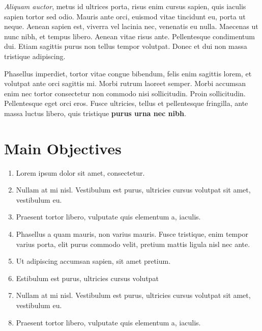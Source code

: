 \documentclass[a0,landscape]{a0poster}
\begin{document}
\begin{multicols}{4}
\textit{Aliquam auctor}, metus id ultrices porta, risus enim cursus sapien, quis iaculis sapien tortor sed odio. Mauris ante orci, euismod vitae tincidunt eu, porta ut neque. Aenean sapien est, viverra vel lacinia nec, venenatis eu nulla. Maecenas ut nunc nibh, et tempus libero. Aenean vitae risus ante. Pellentesque condimentum dui. Etiam sagittis purus non tellus tempor volutpat. Donec et dui non massa tristique adipiscing.

Phasellus imperdiet, tortor vitae congue bibendum, felis enim sagittis lorem, et volutpat ante orci sagittis mi. Morbi rutrum laoreet semper. Morbi accumsan enim nec tortor consectetur non commodo nisi sollicitudin. Proin sollicitudin. Pellentesque eget orci eros. Fusce ultricies, tellus et pellentesque fringilla, ante massa luctus libero, quis tristique \textbf{purus urna nec nibh}.


\color{DarkSlateGray} %

\section*{Main Objectives}

\begin{enumerate}
\item Lorem ipsum dolor sit amet, consectetur.
\item Nullam at mi nisl. Vestibulum est purus, ultricies cursus volutpat sit amet, vestibulum eu.
\item Praesent tortor libero, vulputate quis elementum a, iaculis.
\item Phasellus a quam mauris, non varius mauris. Fusce tristique, enim tempor varius porta, elit purus commodo velit, pretium mattis ligula nisl nec ante.
\item Ut adipiscing accumsan sapien, sit amet pretium.
\item Estibulum est purus, ultricies cursus volutpat
\item Nullam at mi nisl. Vestibulum est purus, ultricies cursus volutpat sit amet, vestibulum eu.
\item Praesent tortor libero, vulputate quis elementum a, iaculis.
\end{enumerate}



\end{multicols}
\end{document}
